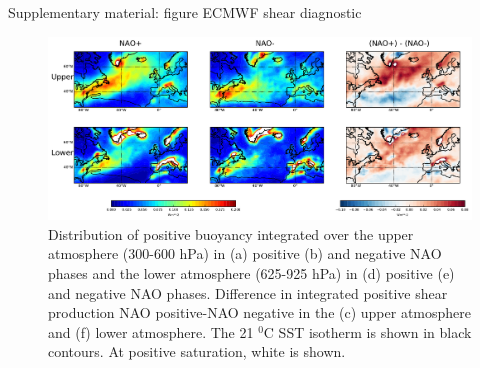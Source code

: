 Supplementary material: figure ECMWF shear diagnostic
\begin{figure}[h]
	\centering
	\includegraphics[width=32pc]{ERA_6shear_subplot.pdf}
	\caption{Distribution of positive buoyancy integrated over the upper atmosphere (300-600 hPa) in (a) positive (b) and negative NAO phases and the lower atmosphere (625-925 hPa) in (d) positive (e) and negative NAO phases. Difference in integrated positive shear production NAO positive-NAO negative in the (c) upper atmosphere and (f) lower atmosphere. The 21 $^{0}$C SST isotherm is shown in black contours. At positive saturation, white is shown.}
	\label{fig:ERA_shear}
\end{figure}



